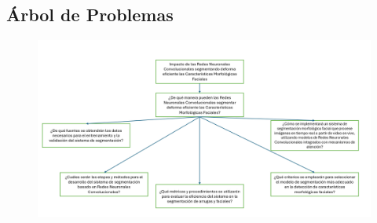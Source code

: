 
\appendix
\setcounter{section}{0}%
\renewcommand{\thesection}{\Alph{section}}%
	
	
	\label{anexo1}
	\begin{landscape}
		\section{Árbol de Problemas}
		\begin{figure}[H]
			\centering
			\includegraphics[width=\linewidth]{anexos/arb_problemas.jpg}
		\end{figure}
		\end{landscape}
	\clearpage
	
